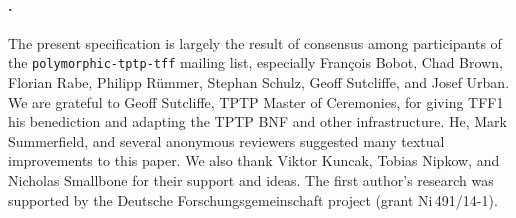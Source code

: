 \paragraph{\textbf{\upshape\ackname.}}
%
The present specification is largely the result of consensus among
participants of the {\tt polymorphic-tptp-tff} mailing list, especially
Fran\c{c}ois Bobot, Chad Brown, Florian Rabe, Philipp R\"ummer, Stephan Schulz,
Geoff Sutcliffe, and Josef Urban.
We are grateful to Geoff Sutcliffe, TPTP Master of Ceremonies, for giving TFF1
his benediction and adapting the TPTP BNF and other infrastructure.
He, Mark Summerfield, and several anonymous reviewers suggested many textual
improvements to this paper.
We also thank Viktor Kuncak, Tobias Nipkow, and Nicholas Smallbone for their
support and ideas.
%
The first author's research was supported by the Deutsche
Forschungs\-gemein\-schaft project  (grant
Ni\,491\slash 14-1).
%
